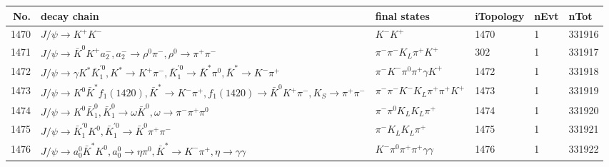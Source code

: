 \begin{table}[htbp] 
\begin{center}
\begin{small}
\begin{tabular}{rlllll}\hline\hline
 No. & decay chain & final states &  iTopology & nEvt & nTot \\\hline
1470&$J/\psi       \rightarrow K^{+}          K^{-}          $&$K^{-}          K^{+}          $& 1470&    1&331916\\
1471&$J/\psi       \rightarrow \bar{K}^{0}   K^{+}          a_{2}^{-}      , a_{2}^{-}       \rightarrow \rho^{0}      \pi^{-}        , \rho^{0}       \rightarrow \pi^{+}        \pi^{-}        $&$\pi^{-}        \pi^{-}        K_{L}          \pi^{+}        K^{+}          $&  302&    1&331917\\
1472&$J/\psi       \rightarrow \gamma       K^{*}          \bar{K}_1^{'0}, K^{*}           \rightarrow K^{+}          \pi^{-}        , \bar{K}_1^{'0} \rightarrow \bar{K}^{*}   \pi^{0}        , \bar{K}^{*}    \rightarrow K^{-}          \pi^{+}        $&$\pi^{-}        K^{-}          \pi^{0}        \pi^{+}        \gamma       K^{+}          $& 1472&    1&331918\\
1473&$J/\psi       \rightarrow K^{0}          \bar{K}^{*}   f_{1}(1420)    , \bar{K}^{*}    \rightarrow K^{-}          \pi^{+}        , f_{1}(1420)     \rightarrow \bar{K}^{0}   K^{+}          \pi^{-}        , K_{S}           \rightarrow \pi^{+}        \pi^{-}        $&$\pi^{-}        \pi^{-}        K^{-}          K_{L}          \pi^{+}        \pi^{+}        K^{+}          $& 1473&    1&331919\\
1474&$J/\psi       \rightarrow K^{0}          \bar{K}_1^{0} , \bar{K}_1^{0}  \rightarrow \omega         \bar{K}^{0}   , \omega          \rightarrow \pi^{-}        \pi^{+}        \pi^{0}        $&$\pi^{-}        \pi^{0}        K_{L}          K_{L}          \pi^{+}        $& 1474&    1&331920\\
1475&$J/\psi       \rightarrow \bar{K}_1^{'0}K^{0}          , \bar{K}_1^{'0} \rightarrow \bar{K}^{0}   \pi^{+}        \pi^{-}        $&$\pi^{-}        K_{L}          K_{L}          \pi^{+}        $& 1475&    1&331921\\
1476&$J/\psi       \rightarrow a_{0}^{0}      \bar{K}^{*}   K^{0}          , a_{0}^{0}       \rightarrow \eta          \pi^{0}        , \bar{K}^{*}    \rightarrow K^{-}          \pi^{+}        , \eta           \rightarrow \gamma       \gamma       $&$K^{-}          \pi^{0}        \pi^{+}        \pi^{+}        \gamma       \gamma       $& 1476&    1&331922\\

\end{tabular}
\end{small}
\end{center}
\end{table}
